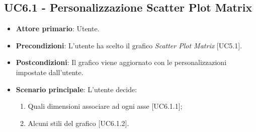 \subsection{UC6.1 - Personalizzazione Scatter Plot Matrix}
\begin{itemize}
	\item \textbf{Attore primario}: Utente.
	
	\item \textbf{Precondizioni}: L'utente ha scelto il grafico \textit{Scatter Plot Matrix} [UC5.1].
	
	\item \textbf{Postcondizioni}: Il grafico viene aggiornato con le personalizzazioni impostate dall'utente.
	
	\item \textbf{Scenario principale}: L'utente decide:

\begin{enumerate}
\item Quali dimensioni associare ad ogni asse [UC6.1.1];
\item Alcuni stili del grafico [UC6.1.2].
\end{enumerate}	
	
		

\end{itemize}



